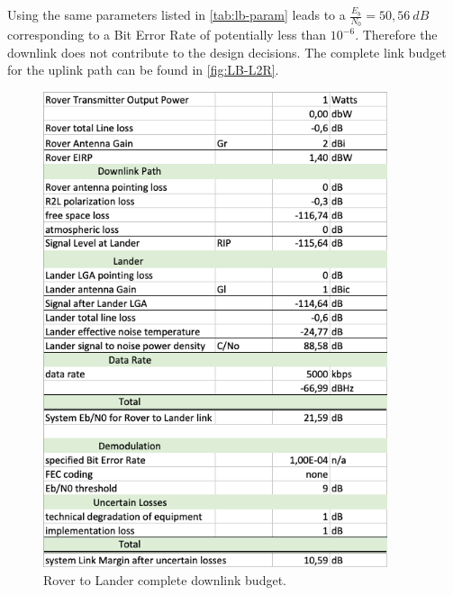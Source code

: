 Using the same parameters listed in \autoref{tab:lb-param} leads to a $\frac{{E}_{b}}{{N}_{0}} = 50,56\ dB$ corresponding to a Bit Error Rate of potentially less than $10^{-6}$. Therefore the downlink does not contribute to the design decisions. The complete link budget for the uplink path can be found in \autoref{fig:LB-L2R}.

\begin{figure}[h]
	\centering
  		\includegraphics[width=0.9\textwidth]{Media/LB-RovertoLander.png}
  \caption{Rover to Lander complete downlink budget.}
  \label{fig:LB-R2L}
\end{figure}


